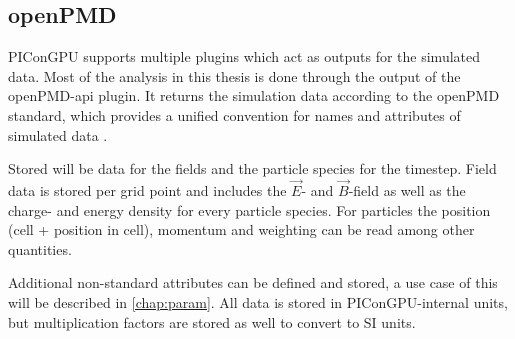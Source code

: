 \documentclass[bachelor_thesis]{subfiles}
\begin{document}
\subsection{openPMD}
PIConGPU supports multiple plugins which act as outputs for the simulated data. Most of the analysis in this thesis is done through the output of the openPMD-api \cite{openPMDAPI} plugin.
It returns the simulation data according to the openPMD standard, which provides a unified convention for names and attributes of simulated data \cite{openPMDstandard}.

Stored will be data for the fields and the particle species for the timestep. Field data is stored per grid point and includes the $\vec{E}$- and $\vec{B}$-field as well as the charge- and energy density for every particle species.
For particles the position (cell + position in cell), momentum and weighting can be read among other quantities. 

Additional non-standard attributes can be defined and stored, a use case of this will be described in \autoref{chap:param}. All data is stored in PIConGPU-internal units, but multiplication factors are stored as well to convert to SI units.
\end{document}
